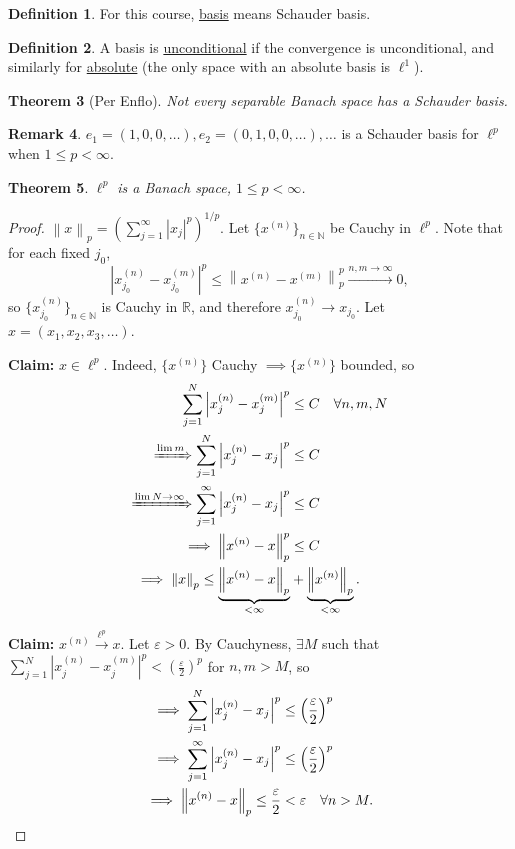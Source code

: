 \documentclass[12pt]{article}
\newcommand{\abs}[1]{\left| #1 \right|}
\newcommand{\norm}[1]{\left\| #1 \right\|}
\newcommand{\R}{\mathbb{R}}
\newcommand{\N}{\mathbb{N}}
\newtheorem{thm}{Theorem}[section]
\theoremstyle{definition}
\newtheorem{defn}[thm]{Definition}
\newtheorem{rmk}[thm]{Remark}
\begin{document}
\begin{defn}
	For this course, \underline{basis} means Schauder basis.
\end{defn}

\begin{defn}
	A basis is \underline{unconditional} if the convergence is unconditional, and similarly for \underline{absolute} (the only space with an absolute basis is $\ell^1$).
\end{defn}

\begin{thm}[Per Enflo]
	Not every separable Banach space has a Schauder basis.
\end{thm}

\begin{rmk}
	$e_1 = (1,0,0,\dots), e_2 = (0,1,0,0,\dots), \dots$ is a Schauder basis for $\ell^p$ when $1 \leq p < \infty$.
\end{rmk}

\begin{thm}
	$\ell^p$ is a Banach space, $1 \leq p < \infty$.
\end{thm}
\begin{proof}
	$\norm{x}_p = \left( \sum_{j=1}^\infty \abs{x_j}^p \right)^{1/p}$.
	Let $\lbrace x^{(n)} \rbrace_{n \in \N}$ be Cauchy in $\ell^p$.
	Note that for each fixed $j_0$,
	\begin{equation*}
		\abs{x_{j_0}^{(n)} - x_{j_0}^{(m)}}^p \leq \norm{x^{(n)} - x^{(m)}}_p^p \xrightarrow{n,m \to \infty} 0,
	\end{equation*}
	so $\lbrace x_{j_0}^{(n)} \rbrace_{n \in \N}$ is Cauchy in $\R$, and therefore $x_{j_0}^{(n)} \to x_{j_0}$.
	Let $x = (x_1, x_2, x_3, \dots)$.

	\textbf{Claim: } $x \in \ell^p$.
	Indeed, $\lbrace x^{(n)} \rbrace$ Cauchy $\implies \lbrace x^{(n)} \rbrace$ bounded, so
	\begin{align*}
		\sum_{j=1}^N \abs{x_j^{(n)} - x_j^{(m)}}^p &\leq C \quad \forall n, m, N \\
		\xRightarrow{\lim m} \sum_{j=1}^N \abs{x_j^{(n)} - x_j}^p &\leq C \\
		\xRightarrow{\lim N \to \infty} \sum_{j=1}^\infty \abs{x_j^{(n)} - x_j}^p &\leq C \\
		\implies \norm{x^{(n)} - x}_p^p &\leq C \\
		\implies \norm{x}_p \leq \underbrace{\norm{x^{(n)} - x}_p}_{< \infty} &+ \underbrace{\norm{x^{(n)}}_p}_{< \infty}.
	\end{align*}

	\textbf{Claim: } $x^{(n)} \xrightarrow{\ell^p} x$.
	Let $\varepsilon > 0$.
	By Cauchyness, $\exists M$ such that $\sum_{j=1}^N \abs{x_j^{(n)} - x_j^{(m)}}^p < \left( \frac{\varepsilon}{2} \right)^p$ for $n, m > M$, so
	\begin{align*}
		\implies \sum_{j=1}^N \abs{x_j^{(n)} - x_j}^p &\leq \left( \frac{\varepsilon}{2} \right)^p \\
		\implies \sum_{j=1}^\infty \abs{x_j^{(n)} - x_j}^p &\leq \left( \frac{\varepsilon}{2} \right)^p \\
		\implies \norm{x^{(n)} - x}_p \leq \frac{\varepsilon}{2} &< \varepsilon \quad \forall n > M. \qedhere
	\end{align*}
\end{proof}
\end{document}
